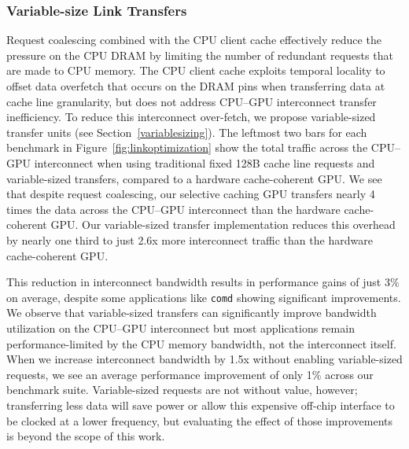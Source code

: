 \subsubsection{Variable-size Link Transfers}
\label{linkoptimization}
Request coalescing combined with the CPU client cache effectively reduce the pressure on the CPU DRAM by limiting
the number of redundant requests that are made to CPU memory.  The CPU client cache exploits temporal locality
to offset data overfetch that occurs on the DRAM pins when transferring data at cache line granularity, but
does not address CPU--GPU interconnect transfer inefficiency.
To reduce this interconnect over-fetch, we propose variable-sized transfer units
(see Section~\ref{variablesizing}). The leftmost two bars for each benchmark in Figure~\ref{fig:linkoptimization} show the total traffic across the
CPU--GPU interconnect when using traditional fixed 128B cache line requests and
variable-sized transfers, compared to a hardware cache-coherent
GPU.  We see that despite request coalescing, our selective caching GPU transfers nearly 4 times the data
across the CPU--GPU interconnect than the hardware cache-coherent GPU.  Our variable-sized transfer
implementation reduces this overhead by nearly one third to just 2.6x more
interconnect traffic than the hardware cache-coherent GPU.

This reduction in interconnect bandwidth results in performance gains of just
3\% on average, despite some applications like {\tt comd} showing significant improvements. 
We observe that variable-sized transfers can significantly improve bandwidth utilization
on the CPU--GPU interconnect but most applications remain performance-limited by the CPU memory 
bandwidth, not the interconnect itself. When we increase interconnect bandwidth by 1.5x without enabling variable-sized
requests, we see an average performance improvement of only 1\% across our benchmark suite.
Variable-sized requests are not without value, however;
transferring less data will save power or allow this expensive off-chip interface to be clocked at a lower
frequency, but evaluating the effect of those improvements is beyond the scope of this work.

